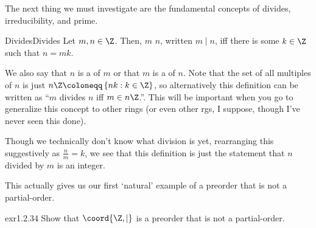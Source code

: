 The next thing we must investigate are the fundamental concepts of divides, irreducibility, and prime.
\begin{dfn}{Divides}{Divides}
Let $m,n\in \Z$.  Then, $m$  $n$, written $m\mid n$, iff there is some $k\in \Z$ such that $n=mk$.
\begin{rmk}
We also say that $n$ is a  of $m$ or that $m$ is a  of $n$.  Note that the set of all multiples of $n$ is just $n\Z \coloneqq \left\{ nk:k\in \Z \right\}$, so alternatively this definition can be written as ``$m$ divides $n$ iff $m\in n\Z$.''.  This will be important when you go to generalize this concept to other rings (or even other rgs, I suppose, though I've never seen this done).
\end{rmk}
\begin{rmk}
Though we technically don't know what division is yet, rearranging this suggestively as $\frac{n}{m}=k$, we see that this definition is just the statement that $n$ divided by $m$ is an integer.
\end{rmk}
\end{dfn}
This actually gives us our first `natural' example of a preorder that is not a partial-order.
\begin{exr}{}{exr1.2.34}
Show that $\coord{\Z ,\mid}$ is a preorder that is not a partial-order.
\end{exr}

